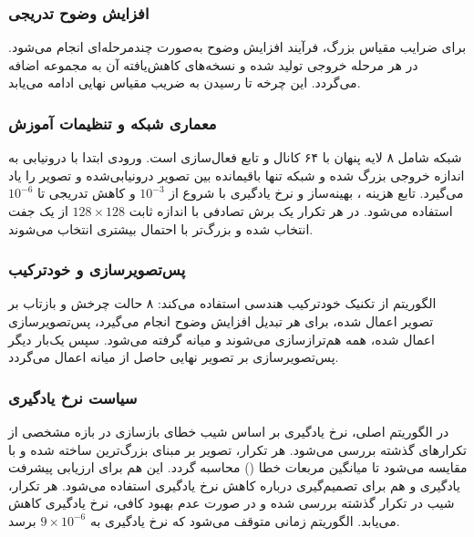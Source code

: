 \subsubsection{افزایش وضوح تدریجی}
برای ضرایب مقیاس بزرگ، فرآیند افزایش وضوح به‌صورت چندمرحله‌ای انجام می‌شود. در هر مرحله خروجی  تولید شده و نسخه‌های کاهش‌یافته آن به مجموعه  اضافه می‌گردد. این چرخه تا رسیدن به ضریب مقیاس نهایی ادامه می‌یابد.

\subsubsection{معماری شبکه و تنظیمات آموزش}
شبکه شامل ۸ لایه پنهان با ۶۴ کانال و تابع فعال‌سازی  است. ورودی ابتدا با درونیابی به اندازه خروجی بزرگ شده و شبکه تنها باقیمانده بین تصویر درونیابی‌شده و تصویر  را یاد می‌گیرد. تابع هزینه ، بهینه‌ساز  و نرخ یادگیری با شروع از $10^{-3}$ و کاهش تدریجی تا $10^{-6}$ استفاده می‌شود. در هر تکرار یک برش تصادفی با اندازه ثابت $128 \times 128$ از یک جفت  انتخاب شده و  بزرگ‌تر با احتمال بیشتری انتخاب می‌شوند.

\subsubsection{پس‌تصویرسازی و خودترکیب}
الگوریتم از تکنیک خودترکیب هندسی استفاده می‌کند: ۸ حالت چرخش و بازتاب بر تصویر اعمال شده، برای هر تبدیل افزایش وضوح انجام می‌گیرد، پس‌تصویرسازی اعمال شده، همه هم‌ترازسازی می‌شوند و میانه گرفته می‌شود. سپس یک‌بار دیگر پس‌تصویرسازی بر تصویر نهایی حاصل از میانه اعمال می‌گردد.

\subsubsection{سیاست نرخ یادگیری}
در الگوریتم اصلی، نرخ یادگیری بر اساس شیب خطای بازسازی در بازه مشخصی از تکرارهای گذشته بررسی می‌شود. هر  تکرار، تصویر  بر مبنای بزرگ‌ترین  ساخته شده و با  مقایسه می‌شود تا میانگین مربعات خطا () محاسبه گردد. این  هم برای ارزیابی پیشرفت یادگیری و هم برای تصمیم‌گیری درباره کاهش نرخ یادگیری استفاده می‌شود. هر  تکرار، شیب  در  تکرار گذشته بررسی شده و در صورت عدم بهبود کافی، نرخ یادگیری کاهش می‌یابد. الگوریتم زمانی متوقف می‌شود که نرخ یادگیری به $9 \times 10^{-6}$ برسد.

